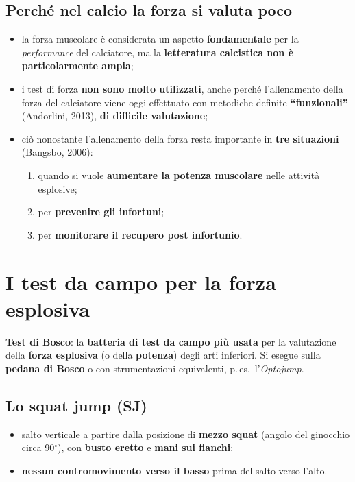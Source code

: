 \subsection{Perché nel calcio la forza si valuta poco}

\begin{itemize}
  \item la forza muscolare è considerata un aspetto \textbf{fondamentale} per la \textit{performance}
    del calciatore, ma la \textbf{letteratura calcistica non è particolarmente ampia};
  \item i test di forza \textbf{non sono molto utilizzati}, anche perché l'allenamento della forza
    del calciatore viene oggi effettuato con metodiche definite \textbf{``funzionali''} (Andorlini,
    2013), \textbf{di difficile valutazione};
  \item ciò nonostante l'allenamento della forza resta importante in \textbf{tre situazioni}
    (Bangsbo, 2006):
    \begin{enumerate}
      \item quando si vuole \textbf{aumentare la potenza muscolare} nelle attività esplosive;
      \item per \textbf{prevenire gli infortuni};
      \item per \textbf{monitorare il recupero post infortunio}.
    \end{enumerate}
\end{itemize}

\section{I test da campo per la forza esplosiva}

\textbf{Test di Bosco}: la \textbf{batteria di test da campo più usata} per la valutazione della
\textbf{forza esplosiva} (o della \textbf{potenza}) degli arti inferiori. Si esegue sulla
\textbf{pedana di Bosco} o con strumentazioni equivalenti, p.\,es.\ l'\textit{Optojump}.

\subsection{Lo squat jump (SJ)}

\begin{itemize}
  \item salto verticale a partire dalla posizione di \textbf{mezzo squat} (angolo del ginocchio
    circa 90$^\circ$), con \textbf{busto eretto} e \textbf{mani sui fianchi};
  \item \textbf{nessun contromovimento verso il basso} prima del salto verso l'alto.
\end{itemize}

